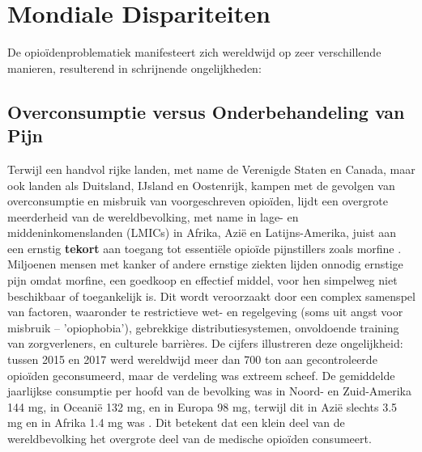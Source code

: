 \documentclass[11pt, a4paper]{report} %
\begin{document}
\section{Mondiale Dispariteiten}
De opioïdenproblematiek manifesteert zich wereldwijd op zeer verschillende manieren, resulterend in schrijnende ongelijkheden:
\subsection{Overconsumptie versus Onderbehandeling van Pijn}
Terwijl een handvol rijke landen, met name de Verenigde Staten en Canada, maar ook landen als Duitsland, IJsland en Oostenrijk, kampen met de gevolgen van overconsumptie en misbruik van voorgeschreven opioïden, lijdt een overgrote meerderheid van de wereldbevolking, met name in lage- en middeninkomenslanden (LMICs) in Afrika, Azië en Latijns-Amerika, juist aan een ernstig \textbf{tekort} aan toegang tot essentiële opioïde pijnstillers zoals morfine \parencite{UCLNews2022GlobalDisparities, INCB2024Report}. Miljoenen mensen met kanker of andere ernstige ziekten lijden onnodig ernstige pijn omdat morfine, een goedkoop en effectief middel, voor hen simpelweg niet beschikbaar of toegankelijk is. Dit wordt veroorzaakt door een complex samenspel van factoren, waaronder te restrictieve wet- en regelgeving (soms uit angst voor misbruik – 'opiophobia'), gebrekkige distributiesystemen, onvoldoende training van zorgverleners, en culturele barrières. De cijfers illustreren deze ongelijkheid: tussen 2015 en 2017 werd wereldwijd meer dan 700 ton aan gecontroleerde opioïden geconsumeerd, maar de verdeling was extreem scheef. De gemiddelde jaarlijkse consumptie per hoofd van de bevolking was in Noord- en Zuid-Amerika 144 mg, in Oceanië 132 mg, en in Europa 98 mg, terwijl dit in Azië slechts 3.5 mg en in Afrika 1.4 mg was \parencite{PMCID8801686GlobalConsumption}. Dit betekent dat een klein deel van de wereldbevolking het overgrote deel van de medische opioïden consumeert.
\end{document}

